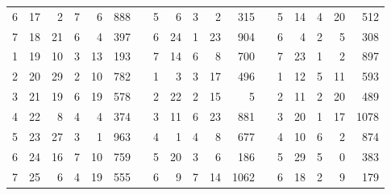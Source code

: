 \begin{tabnums}
\begin{tabular}[c]{@{} r r r rrr c r r rrr c r r rrr @{}}
\midrule
6 & 17 &  2 &  7& 6& 888 && 5 &  6 & 3& 2& 315 && 5 & 14 & 4&20& 512 \\
7 & 18 & 21 &  6& 4& 397 && 6 & 24 & 1&23& 904 && 6 &  4 & 2& 5& 308 \\
1 & 19 & 10 &  3&13& 193 && 7 & 14 & 6& 8& 700 && 7 & 23 & 1& 2& 897 \\
2 & 20 & 29 &  2&10& 782 && 1 &  3 & 3&17& 496 && 1 & 12 & 5&11& 593 \\
\midrule
3 & 21 & 19 &  6&19& 578 && 2 & 22 & 2&15&   5 && 2 & 11 & 2&20& 489 \\
4 & 22 &  8 &  4& 4& 374 && 3 & 11 & 6&23& 881 && 3 & 20 & 1&17&1078 \\
5 & 23 & 27 &  3& 1& 963 && 4 &  1 & 4& 8& 677 && 4 & 10 & 6& 2& 874 \\
6 & 24 & 16 &  7&10& 759 && 5 & 20 & 3& 6& 186 && 5 & 29 & 5& 0& 383 \\
7 & 25 &  6 &  4&19& 555 && 6 &  9 & 7&14&1062 && 6 & 18 & 2& 9& 179 \\
\bottomrule
\end{tabular}
\caption[[Noviluniorum Medoirum Thoth, Sahami, Phurdin{]}]{%
Generalis Noviluniorum Mediorum Thoth Nabonassari, Sahami Ar\-me\-ni\-o\-rum, Phrurdin, Iezdegird. idque Alexandriae}
\label{tab:p218b}
\end{tabnums}

